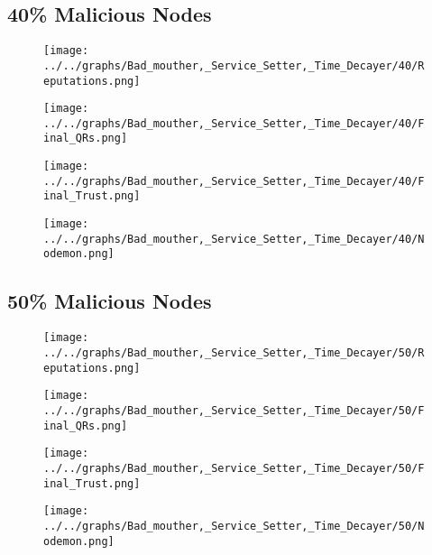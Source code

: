 \begin{minipage}[t]{0.49\columnwidth}
\subsection*{40\% Malicious Nodes}
    \begin{figure}[H]
        \centering
        \texttt{[image: ../../graphs/Bad\_mouther,\_Service\_Setter,\_Time\_Decayer/40/Reputations.png]}
    \end{figure}
    \begin{figure}[H]
        \centering
        \texttt{[image: ../../graphs/Bad\_mouther,\_Service\_Setter,\_Time\_Decayer/40/Final\_QRs.png]}
    \end{figure}
\end{minipage}
\begin{minipage}[t]{0.49\columnwidth}
    \begin{figure}[H]
        \centering
        \texttt{[image: ../../graphs/Bad\_mouther,\_Service\_Setter,\_Time\_Decayer/40/Final\_Trust.png]}
    \end{figure}
    \begin{figure}[H]
        \centering
        \texttt{[image: ../../graphs/Bad\_mouther,\_Service\_Setter,\_Time\_Decayer/40/Nodemon.png]}
    \end{figure}
\end{minipage}

\begin{minipage}[t]{0.49\columnwidth}
\subsection*{50\% Malicious Nodes}
    \begin{figure}[H]
        \centering
        \texttt{[image: ../../graphs/Bad\_mouther,\_Service\_Setter,\_Time\_Decayer/50/Reputations.png]}
    \end{figure}
    \begin{figure}[H]
        \centering
        \texttt{[image: ../../graphs/Bad\_mouther,\_Service\_Setter,\_Time\_Decayer/50/Final\_QRs.png]}
    \end{figure}
\end{minipage}
\begin{minipage}[t]{0.49\columnwidth}
    \begin{figure}[H]
        \centering
        \texttt{[image: ../../graphs/Bad\_mouther,\_Service\_Setter,\_Time\_Decayer/50/Final\_Trust.png]}
    \end{figure}
    \begin{figure}[H]
        \centering
        \texttt{[image: ../../graphs/Bad\_mouther,\_Service\_Setter,\_Time\_Decayer/50/Nodemon.png]}
    \end{figure}
\end{minipage}

